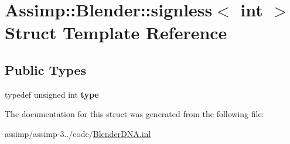\hypertarget{struct_assimp_1_1_blender_1_1signless_3_01int_01_4}{\section{Assimp\+:\+:Blender\+:\+:signless$<$ int $>$ Struct Template Reference}
\label{struct_assimp_1_1_blender_1_1signless_3_01int_01_4}
}
\subsection*{Public Types}
\begin{DoxyCompactItemize}
\item 
\hypertarget{struct_assimp_1_1_blender_1_1signless_3_01int_01_4_a702af286b6388eb53798f1e6dde43737}{typedef unsigned int {\bfseries type}}\label{struct_assimp_1_1_blender_1_1signless_3_01int_01_4_a702af286b6388eb53798f1e6dde43737}

\end{DoxyCompactItemize}


The documentation for this struct was generated from the following file\+:\begin{DoxyCompactItemize}
\item 
assimp/assimp-\/3../code/\hyperlink{_blender_d_n_a_8inl}{Blender\+D\+N\+A.\+inl}\end{DoxyCompactItemize}

